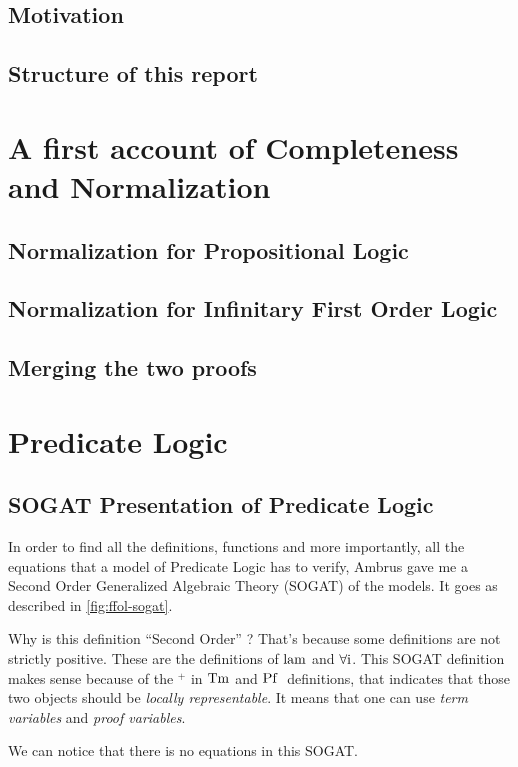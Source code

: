 \documentclass[10pt,a4paper]{article}
\begin{document}
		\subsection{Motivation}
		\subsection{Structure of this report}
	\section{A first account of Completeness and Normalization}
		\subsection{Normalization for Propositional Logic}
		\subsection{Normalization for Infinitary First Order Logic}
		\subsection{Merging the two proofs}
	\section{Predicate Logic}
		\subsection{SOGAT Presentation of Predicate Logic}
		
		In order to find all the definitions, functions and more importantly, all the equations that a model of Predicate Logic has to verify, Ambrus gave me a Second Order Generalized Algebraic Theory (SOGAT) of the models. It goes as described in \autoref{fig:ffol-sogat}.
		
		Why is this definition \enquote{Second Order} ? That's because some definitions are not strictly positive. These are the definitions of $\operatorname{lam}$ and $\operatorname{\operatorname{\forall i}}$. This SOGAT definition makes sense because of the ${}^+$ in $\operatorname{Tm}$ and $\operatorname{Pf}\;$ definitions, that indicates that those two objects should be \emph{locally representable}. It means that one can use \emph{term variables} and \emph{proof variables}.
		
		We can notice that there is no equations in this SOGAT.
		
\end{document}
